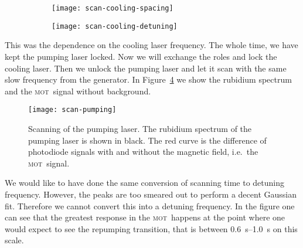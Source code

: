 \documentclass[11pt, english, fleqn, DIV=15, headinclude, BCOR=2cm]{scrreprt}
\newcommand\mot{\textsc{mot}}
\begin{document}
\begin{figure}
    \centering
    \begin{subfigure}[c]{0.48\linewidth}
        \centering
        \texttt{[image: scan-cooling-spacing]}
        \caption{%
            }
        \label{fig:scan-cooling-spacing}
    \end{subfigure}
    \hfill
    \begin{subfigure}[c]{0.48\linewidth}
        \centering
        \texttt{[image: scan-cooling-detuning]}
        \caption{%
            }
        \label{fig:scan-cooling-detuning}
    \end{subfigure}
    \caption{%
        }
    \label{fig:}
\end{figure}

This was the dependence on the cooling laser frequency. The whole time, we have
kept the pumping laser locked. Now we will exchange the roles and lock the
cooling laser. Then we unlock the pumping laser and let it scan with the same
slow frequency from the generator. In Figure~\ref{fig:scan-pumping} we show the
rubidium spectrum and the \mot\ signal without background.

\begin{figure}
    \centering
    \texttt{[image: scan-pumping]}
    \caption{%
        Scanning of the pumping laser. The rubidium spectrum of the pumping
        laser is shown in black. The red curve is the difference of photodiode
        signals with and without the magnetic field, i.e.\ the \mot\ signal.
    }
    \label{fig:scan-pumping}
\end{figure}

We would like to have done the same conversion of scanning time to detuning
frequency. However, the peaks are too smeared out to perform a decent Gaussian
fit. Therefore we cannot convert this into a detuning frequency.
In the figure one can see that the greatest response in the \mot\ happens at
the point where one would expect to see the repumping transition, that is
between \SIrange{0.6}{1.0}{\second} on this scale.
\end{document}
